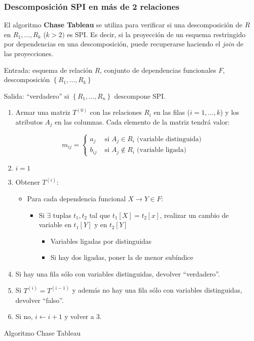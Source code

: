 \documentclass[a4paper, twoside]{article}
\begin{document}
\subsubsection{Descomposición SPI en más de 2 relaciones}

El algoritmo \textbf{Chase Tableau }se utiliza para verificar si una
descomposición de $R$ en $R_{1},\ldots,R_{k}$ ($k>2)$ es SPI. Es
decir, si la proyección de un esquema restringido por dependencias
en una descomposición, puede recuperarse haciendo el \emph{join} de
las proyecciones.

\begin{algorithm}[H]
Entrada: esquema de relación $R$, conjunto de dependencias funcionales
$F$, descomposición $\left\{ R_{1},\ldots,R_{k}\right\} $

Salida: ``verdadero'' si $\left\{ R_{1},\ldots,R_{n}\right\} $
descompone SPI.
\begin{enumerate}
\item Armar una matriz $T^{(0)}$ con las relaciones $R_{i}$ en las filas
($i=1,\ldots,k$) y los atributos $A_{j}$ en las columnas. Cada elemento
de la matriz tendrá valor:


\[
m_{ij}=\begin{cases}
a_{j} & \text{ si }A_{j}\in R_{i}\text{ (variable distinguida)}\\
b_{ij} & \text{ si }A_{j}\not\in R_{i}\text{ (variable ligada)}
\end{cases}
\]


\item $i=1$
\item Obtener $T^{(i)}$:

\begin{itemize}
\item Para cada dependencia funcional $X\to Y\in F$:

\begin{itemize}
\item Si $\exists$ tuplas $t_{1},t_{2}$ tal que $t_{1}[X]=t_{2}[x]$,
realizar un cambio de variable en $t_{1}[Y]$ y en $t_{2}[Y]$

\begin{itemize}
\item Variables ligadas por distinguidas
\item Si hay dos ligadas, poner la de menor subíndice
\end{itemize}
\end{itemize}
\end{itemize}
\item Si hay una fila sólo con variables distinguidas, devolver ``verdadero''.
\item Si $T^{(i)}=T^{(i-1)}$ y además no hay una fila sólo con variables
distinguidas, devolver ``falso''.
\item Si no, $i\leftarrow i+1$ y volver a 3.
\end{enumerate}
\protect\caption{Algoritmo Chase Tableau}


\end{algorithm}
\end{document}
